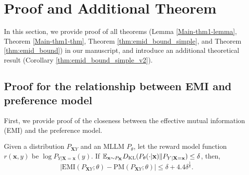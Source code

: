 \newpage
\section{Proof and Additional Theorem}\label{appendix:thm}


In this section, we provide proof of all theorems (Lemma \ref{Main-thm1-lemma}, Theorem \ref{Main-thm1-thm}, Theorem \ref{thm:emid_bound_simple}, and Theorem \ref{thm:emid_bound}) in our manuscript, and introduce an additional theoretical result (Corollary \ref{thm:emid_bound_simple_v2}). 

\subsection{Proof for the relationship between EMI and preference model}
First, we provide proof of the closeness between the effective mutual information (EMI) and the preference model.

\begin{lemma}\label{Main-thm1-lemma-appendix}
    Given a distribution $P_{\mathbf{X}Y}$ and an MLLM $P_{\theta}$, let the reward model function $r(\mathbf{x},y)$ be $\log P_{Y|\mathbf{X}=\mathbf{x}}(y)$. If
        $\mathbb{E}_{\mathbf{x}\sim P_{\mathbf{X}}} D_{\rm KL}(P_{\theta}(\cdot|\mathbf{x})\| P_{Y|\mathbf{X}=\mathbf{x}}) \leq \delta$, then,
    \begin{equation*}
        |\text{EMI}(P_{\mathbf{X}Y};\theta)-\text{PM}(P_{\mathbf{X}Y};\theta)| \leq \delta + 4.4\delta^{\frac{1}{8}}.
    \end{equation*}
\end{lemma}

